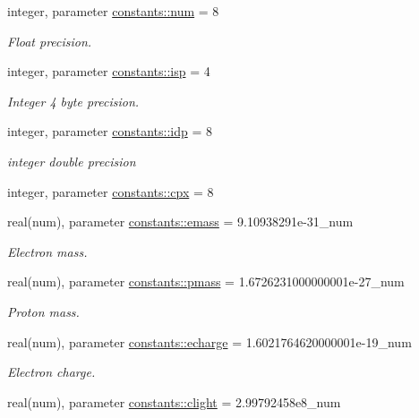 \begin{DoxyCompactItemize}
\item 
integer, parameter \hyperlink{namespaceconstants_afe19f7f8af171411c51fb763b36e3823}{constants\+::num} = 8
\begin{DoxyCompactList}\small\item\em Float precision. \end{DoxyCompactList}\item 
integer, parameter \hyperlink{namespaceconstants_a5a2ae450a00d2a29f9b70dcb776f7a2f}{constants\+::isp} = 4
\begin{DoxyCompactList}\small\item\em Integer 4 byte precision. \end{DoxyCompactList}\item 
integer, parameter \hyperlink{namespaceconstants_ae345db51770e3628e6aaf76e6a45e160}{constants\+::idp} = 8
\begin{DoxyCompactList}\small\item\em integer double precision \end{DoxyCompactList}\item 
integer, parameter \hyperlink{namespaceconstants_a5709f0ae2ee52b1906446ad25ed0f587}{constants\+::cpx} = 8
\item 
real(num), parameter \hyperlink{namespaceconstants_ad39536f583f0861abb2fb19a27c56fc8}{constants\+::emass} = 9.\+10938291e-\/31\+\_\+num
\begin{DoxyCompactList}\small\item\em Electron mass. \end{DoxyCompactList}\item 
real(num), parameter \hyperlink{namespaceconstants_a44f3d8cbf9c39db63d7533d985cc51c3}{constants\+::pmass} = 1.\+6726231000000001e-\/27\+\_\+num
\begin{DoxyCompactList}\small\item\em Proton mass. \end{DoxyCompactList}\item 
real(num), parameter \hyperlink{namespaceconstants_af0f1098f6be55eab4174890ed5caaf98}{constants\+::echarge} = 1.\+6021764620000001e-\/19\+\_\+num
\begin{DoxyCompactList}\small\item\em Electron charge. \end{DoxyCompactList}\item 
real(num), parameter \hyperlink{namespaceconstants_ac23d8857383002cada2aa571fd859533}{constants\+::clight} = 2.\+99792458e8\+\_\+num

\end{DoxyCompactItemize}
